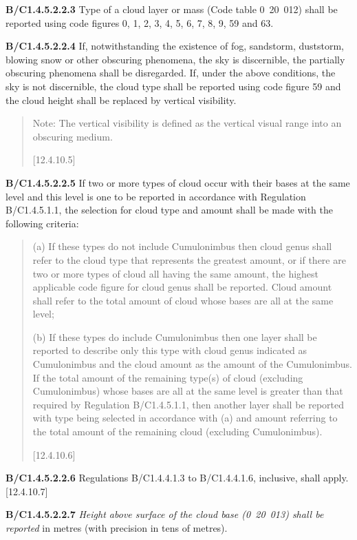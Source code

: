 \textbf{B/C1.4.5.2.2.3} Type of a cloud layer or mass (Code table 0~20~012) shall be reported using code figures 0, 1, 2, 3, 4, 5, 6, 7, 8, 9, 59 and 63.

\textbf{B/C1.4.5.2.2.4} If, notwithstanding the existence of fog, sandstorm, duststorm, blowing snow or other obscuring phenomena, the sky is discernible, the partially obscuring phenomena shall be disregarded. If, under the above conditions, the sky is not discernible, the cloud type shall be reported using code figure 59 and the cloud height shall be replaced by vertical visibility.

\begin{quote}
Note: The vertical visibility is defined as the vertical visual range into an obscuring medium.

{[}12.4.10.5{]}
\end{quote}

\textbf{B/C1.4.5.2.2.5} If two or more types of cloud occur with their bases at the same level and this level is one to be reported in accordance with Regulation B/C1.4.5.1.1, the selection for cloud type and amount shall be made with the following criteria:

\begin{quote}
(a) If these types do not include Cumulonimbus then cloud genus shall refer to the cloud type that represents the greatest amount, or if there are two or more types of cloud all having the same amount, the highest applicable code figure for cloud genus shall be reported. Cloud amount shall refer to the total amount of cloud whose bases are all at the same level;

(b) If these types do include Cumulonimbus then one layer shall be reported to describe only this type with cloud genus indicated as Cumulonimbus and the cloud amount as the amount of the Cumulonimbus. If the total amount of the remaining type(s) of cloud (excluding Cumulonimbus) whose bases are all at the same level is greater than that required by Regulation B/C1.4.5.1.1, then another layer shall be reported with type being selected in accordance with (a) and amount referring to the total amount of the remaining cloud (excluding Cumulonimbus).

{[}12.4.10.6{]}
\end{quote}

\textbf{B/C1.4.5.2.2.6} Regulations B/C1.4.4.1.3 to B/C1.4.4.1.6, inclusive, shall apply. {[}12.4.10.7{]}

\textbf{B/C1.4.5.2.2.7} \emph{Height above surface of the cloud base (0~20~013) shall be reported} in metres (with precision in tens of metres).

